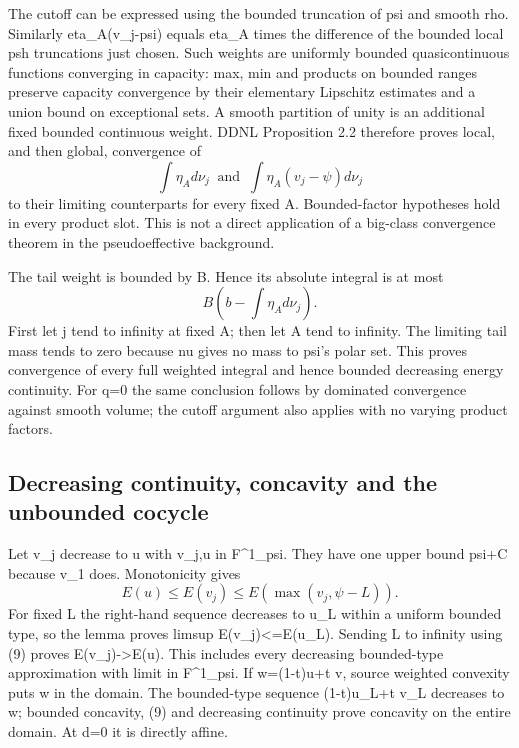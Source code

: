 \documentclass[
]{article}
\begin{document}
The cutoff can be expressed using the bounded truncation of psi and
smooth rho. Similarly eta\_A(v\_j-psi) equals eta\_A times the
difference of the bounded local psh truncations just chosen. Such
weights are uniformly bounded quasicontinuous functions converging in
capacity: max, min and products on bounded ranges preserve capacity
convergence by their elementary Lipschitz estimates and a union bound on
exceptional sets. A smooth partition of unity is an additional fixed
bounded continuous weight. DDNL Proposition 2.2 therefore proves local,
and then global, convergence of \[
\int\eta_A d\nu_j\ \text{ and }\ \int\eta_A(v_j-\psi)d\nu_j
\] to their limiting counterparts for every fixed A. Bounded-factor
hypotheses hold in every product slot. This is not a direct application
of a big-class convergence theorem in the pseudoeffective background.

The tail weight is bounded by B. Hence its absolute integral is at most
\[
B\left(b-\int\eta_A d\nu_j\right).
\] First let j tend to infinity at fixed A; then let A tend to infinity.
The limiting tail mass tends to zero because nu gives no mass to psi's
polar set. This proves convergence of every full weighted integral and
hence bounded decreasing energy continuity. For q=0 the same conclusion
follows by dominated convergence against smooth volume; the cutoff
argument also applies with no varying product factors.

\subsection{Decreasing continuity, concavity and the unbounded
cocycle}\label{decreasing-continuity-concavity-and-the-unbounded-cocycle}

Let v\_j decrease to u with v\_j,u in F\^{}1\_psi. They have one upper
bound psi+C because v\_1 does. Monotonicity gives \[
E(u)\leq E(v_j)\leq E(\max(v_j,\psi-L)).
\] For fixed L the right-hand sequence decreases to u\_L within a
uniform bounded type, so the lemma proves limsup
E(v\_j)\textless=E(u\_L). Sending L to infinity using (9) proves
E(v\_j)-\textgreater E(u). This includes every decreasing bounded-type
approximation with limit in F\^{}1\_psi. If w=(1-t)u+t v, source
weighted convexity puts w in the domain. The bounded-type sequence
(1-t)u\_L+t v\_L decreases to w; bounded concavity, (9) and decreasing
continuity prove concavity on the entire domain. At d=0 it is directly
affine.
\end{document}
